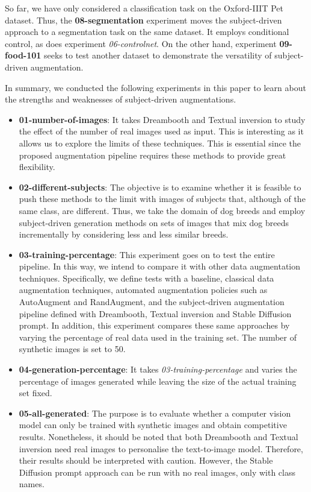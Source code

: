 So far, we have only considered a classification task on the Oxford-IIIT Pet dataset. Thus, the \textbf{08-segmentation} experiment moves the subject-driven approach to a segmentation task on the same dataset. It employs conditional control, as does experiment \textit{06-controlnet}. On the other hand, experiment \textbf{09-food-101} seeks to test another dataset to demonstrate the versatility of subject-driven augmentation.

In summary, we conducted the following experiments in this paper to learn about the strengths and weaknesses of subject-driven augmentations.

\begin{itemize}
    \item \textbf{01-number-of-images}: It takes Dreambooth and Textual inversion to study the effect of the number of real images used as input. This is interesting as it allows us to explore the limits of these techniques. This is essential since the proposed augmentation pipeline requires these methods to provide great flexibility.
    \item \textbf{02-different-subjects}: The objective is to examine whether it is feasible to push these methods to the limit with images of subjects that, although of the same class, are different. Thus, we take the domain of dog breeds and employ subject-driven generation methods on sets of images that mix dog breeds incrementally by considering less and less similar breeds.
    \item \textbf{03-training-percentage}: This experiment goes on to test the entire pipeline. In this way, we intend to compare it with other data augmentation techniques. Specifically, we define tests with a baseline, classical data augmentation techniques, automated augmentation policies such as AutoAugment and RandAugment, and the subject-driven augmentation pipeline defined with Dreambooth, Textual inversion and Stable Diffusion prompt. In addition, this experiment compares these same approaches by varying the percentage of real data used in the training set. The number of synthetic images is set to 50.
    \item \textbf{04-generation-percentage}: It takes \textit{03-training-percentage} and varies the percentage of images generated while leaving the size of the actual training set fixed.
    \item \textbf{05-all-generated}: The purpose is to evaluate whether a computer vision model can only be trained with synthetic images and obtain competitive results. Nonetheless, it should be noted that both Dreambooth and Textual inversion need real images to personalise the text-to-image model. Therefore, their results should be interpreted with caution. However, the Stable Diffusion prompt approach can be run with no real images, only with class names.

\end{itemize}
